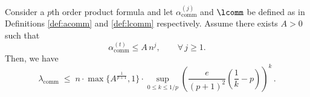 \begin{lemma}\label{lem:lcomm-tight-bound}
Consider a $p$th order product formula and let $\alpha_{\mathrm{comm}}^{(j)}$ and $\lcomm$ be defined as in Definitions \ref{def:acomm} and \ref{def:lcomm} respectively.
Assume there exists $A > 0$ such that
\begin{equation}\label{eq:alpha-comm-bound}
\alpha_{\mathrm{comm}}^{(t)} \le A\, n^{j}, \qquad \forall\, j \ge 1.
\end{equation}
Then, we have
\begin{equation}\label{eq:lambda-comm-bound-explicit}
\lambda_{\mathrm{comm}}
\;\le\;
n \cdot \max\{A^{\frac{1}{p+1}}, 1\} \cdot \sup_{0\leq k \leq 1/p} \left(\frac{e }{(p + 1)^{2}}\left( \frac{1}{k} - p \right) \right)^{k}\,.
\end{equation}
\end{lemma}


